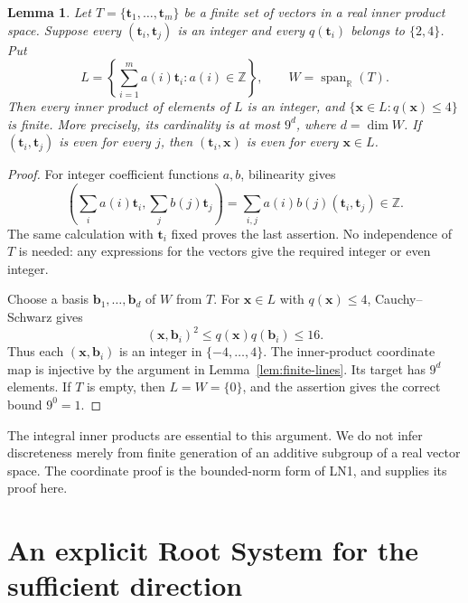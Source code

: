 \documentclass[11pt]{amsart}
\newcommand\ints{{\mathbb Z}}
\newcommand\re{{\mathbb R}}%
\newcommand\Zx{{\mathbf x}}
\newcommand\opk[1]{\mathop{\mathrm{#1}}\nolimits}
\newtheorem{lemma}[theorem]{Lemma}
\theoremstyle{definition}
\newcommand{\Zt}{{\mathbf t}}
\newcommand{\Zb}{{\mathbf b}}
\begin{document}
\begin{lemma}\label{lem:integer-span}
Let $T=\{\Zt_1,\ldots,\Zt_m\}$ be a finite set of vectors in a
real inner product space. Suppose every $(\Zt_i,\Zt_j)$ is an
integer and every $q(\Zt_i)$ belongs to $\{2,4\}$. Put
\[
 L=\left\{\sum_{i=1}^m a(i)\Zt_i:a(i)\in\ints\right\},
 \qquad W=\opk{span}_{\re}(T).
\]
Then every inner product of elements of $L$ is an integer, and
$\{\Zx\in L:q(\Zx)\leq4\}$ is finite. More precisely, its
cardinality is at most $9^d$, where $d=\dim W$.
If $(\Zt_i,\Zt_j)$ is even for every $j$, then
$(\Zt_i,\Zx)$ is even for every $\Zx\in L$.
\end{lemma}
\begin{proof}
For integer coefficient functions $a,b$, bilinearity gives
\[
 \left(\sum_i a(i)\Zt_i,\sum_j b(j)\Zt_j\right)
 =\sum_{i,j}a(i)b(j)(\Zt_i,\Zt_j)\in\ints.
\]
The same calculation with $\Zt_i$ fixed proves the last assertion.
No independence of $T$ is needed: any expressions for the vectors
give the required integer or even integer.

Choose a basis $\Zb_1,\ldots,\Zb_d$ of $W$ from $T$.
For $\Zx\in L$ with $q(\Zx)\leq4$, Cauchy--Schwarz gives
\[
 (\Zx,\Zb_i)^2\leq q(\Zx)q(\Zb_i)\leq16.
\]
Thus each $(\Zx,\Zb_i)$ is an integer in $\{-4,\ldots,4\}$.
The inner-product coordinate map is injective by the argument in
Lemma~\ref{lem:finite-lines}. Its target has $9^d$ elements.
If $T$ is empty, then $L=W=\{0\}$, and the assertion gives the
correct bound $9^0=1$.
\end{proof}

The integral inner products are essential to this argument. We do not
infer discreteness merely from finite generation of an additive subgroup
of a real vector space. The coordinate proof is the bounded-norm form
of LN1, and supplies its proof here.

\section{An explicit Root System for the sufficient direction}\label{sec:construction}
\end{document}

